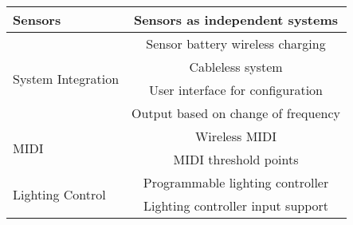     \begin{tabular}{|l|c|}
        \hline
        Sensors                               & \cellcolor{red!25}Sensors as independent systems      \\ \hline \hline
        \multirow{4}{7em}{System Integration} & \cellcolor{red!25}Sensor battery wireless charging    \\ \cline{2-2}
        ~                                     & \cellcolor{red!25}Cableless system                    \\ \cline{2-2}
        ~                                     & \cellcolor{red!25}User interface for configuration    \\ \cline{2-2}
        ~                                     & \cellcolor{red!25}Output based on change of frequency \\ \hline \hline
        \multirow{2}{7em}{MIDI}               & \cellcolor{red!25}Wireless MIDI                       \\ \cline{2-2}
        ~                                     & \cellcolor{red!25}MIDI threshold points               \\ \hline \hline
        \multirow{2}{7em}{Lighting Control}   & \cellcolor{red!25}Programmable lighting controller    \\ \cline{2-2}
        ~                                     & \cellcolor{red!25}Lighting controller input support   \\ \hline
    \end{tabular}
